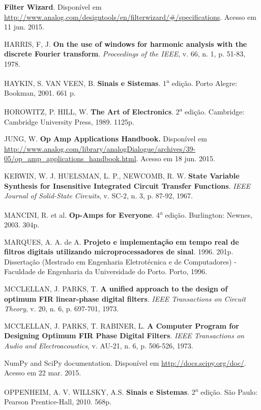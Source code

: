 \begin{thebibliography}{99}
 \textbf{Filter Wizard}. Disponível em \url{http://www.analog.com/designtools/en/filterwizard/#/specifications}. Acesso em 11 jun. 2015.

 HARRIS, F, J. \textbf{On the use of windows for harmonic analysis with the discrete Fourier transform}. \textit{Proceedings of the IEEE}, v. 66, n. 1, p. 51-83, 1978.

 HAYKIN, S. VAN VEEN, B. \textbf{Sinais e Sistemas}. 1\textsuperscript{a} edição. Porto Alegre: Bookman, 2001. 661 p.

 HOROWITZ, P. HILL, W. \textbf{The Art of Electronics}. 2\textsuperscript{a} edição. Cambridge: Cambridge University Press, 1989. 1125p.

 JUNG, W. \textbf{Op Amp Applications Handbook.} Disponível em \url{http://www.analog.com/library/analogDialogue/archives/39-05/op_amp_applications_handbook.html}. Acesso em 18 jun. 2015.

 KERWIN, W. J. HUELSMAN, L. P., NEWCOMB, R. W. \textbf{State Variable Synthesis for Insensitive Integrated Circuit Transfer Functions}. \textit{IEEE Journal of Solid-State Circuits}, v. SC-2, n. 3, p. 87-92, 1967.

 MANCINI, R. et al. \textbf{Op-Amps for Everyone}. 4\textsuperscript{a}  edição. Burlington: Newnes, 2003. 304p.

 MARQUES, A. A. de A. \textbf{Projeto e implementação em tempo real de filtros digitais utilizando microprocessadores de sinal}. 1996. 201p. Dissertação (Mestrado em Engenharia Eletrotécnica e de Computadores) - Faculdade de Engenharia da Universidade do Porto. Porto, 1996. %

 MCCLELLAN, J. PARKS, T. \textbf{A unified approach to the design of optimum FIR linear-phase digital filters}. \textit{IEEE Transactions on Circuit Theory}, v. 20, n. 6, p. 697-701, 1973.

 MCCLELLAN, J. PARKS, T. RABINER, L. \textbf{A Computer Program for Designing Optimum FIR Phase Digital Filters}. \textit{IEEE Transactions on Audio and Electroacoustics}, v. AU-21, n. 6, p. 506-526, 1973.

 NumPy and SciPy documentation. Disponível em \url{http://docs.scipy.org/doc/}. Acesso em 22 mar. 2015.

 OPPENHEIM, A. V. WILLSKY, A.S. \textbf{Sinais e Sistemas}. 2\textsuperscript{a} edição. São Paulo: Pearson Prentice-Hall, 2010. 568p.


\end{thebibliography}
